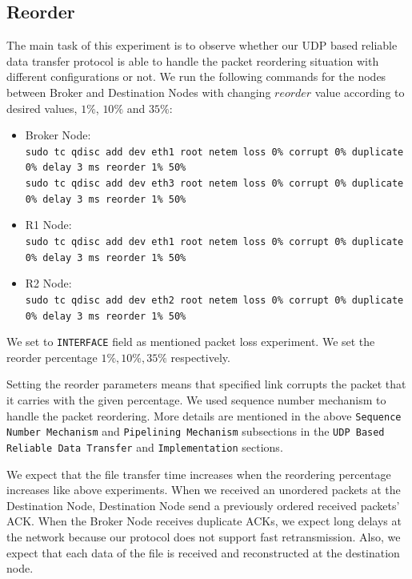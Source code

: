 \documentclass[conference]{IEEEtran}
\begin{document}
\subsection{Reorder}
The main task of this experiment is to observe whether our UDP based reliable data transfer protocol is able to handle the packet reordering situation with different configurations or not. We run the following commands for the nodes between Broker and Destination Nodes with changing $reorder$ value according to desired values, $1\%$, $10\%$ and $35\%$:
\begin{itemize}
    \item Broker Node: \\
        \texttt{sudo tc qdisc add dev eth1 root netem loss 0\% corrupt 0\% duplicate 0\% delay 3 ms reorder 1\% 50\%} \\
        \texttt{sudo tc qdisc add dev eth3 root netem loss 0\% corrupt 0\% duplicate 0\% delay 3 ms reorder 1\% 50\%}
        \item R1 Node: \\
        \texttt{sudo tc qdisc add dev eth1 root netem loss 0\% corrupt 0\% duplicate 0\% delay 3 ms reorder 1\% 50\%}
        \item R2 Node: \\
        \texttt{sudo tc qdisc add dev eth2 root netem loss 0\% corrupt 0\% duplicate 0\% delay 3 ms reorder 1\% 50\%}
\end{itemize}
\par We set to \texttt{INTERFACE} field as mentioned packet loss experiment. We set the reorder percentage $1\%, 10\%, 35\%$ respectively.
\par Setting the reorder parameters means that specified link corrupts the packet that it carries with the given percentage. We used sequence number mechanism to handle the packet reordering. More details are mentioned in the above  \texttt{Sequence Number Mechanism} and \texttt{Pipelining Mechanism} subsections in the \texttt{UDP Based Reliable Data Transfer} and \texttt{Implementation} sections.
\par We expect that the file transfer time increases when the reordering percentage increases like above experiments. When we received an unordered packets at the Destination Node, Destination Node send a previously ordered received packets' ACK. When the Broker Node receives duplicate ACKs, we expect long delays at the network because our protocol does not support fast retransmission. Also, we expect that each data of the file is received and reconstructed at the destination node.
\end{document}
